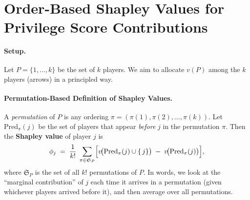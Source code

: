 \documentclass{article}
\begin{document}





\section*{Order-Based Shapley Values for Privilege Score Contributions}

\paragraph{Setup.}
Let $P = \{1,\dots,k\}$ be the set of $k$ players.  
We aim to allocate $v(P)$ among the $k$ players (arrows) in a principled way.

\medskip

\paragraph{Permutation-Based Definition of Shapley Values.}
A \emph{permutation} of $P$ is any ordering $\pi = (\pi(1), \pi(2), \dots, \pi(k))$.  
Let $\mathrm{Pred}_\pi(j)$ be the set of players that appear \emph{before} $j$ in the permutation $\pi$.  
Then the \textbf{Shapley value} of player $j$ is
\[
\phi_j 
\;=\;
\frac{1}{k!}\;
\sum_{\pi \in \mathfrak{S}_P}
\Bigl[v\!\bigl(\mathrm{Pred}_\pi(j) \cup \{\,j\}\bigr)
\;-\;
v\!\bigl(\mathrm{Pred}_\pi(j)\bigr)\Bigr],
\]
where $\mathfrak{S}_P$ is the set of all $k!$ permutations of $P$.  
In words, we look at the “marginal contribution” of $j$ each time it arrives in a permutation (given whichever players arrived before it), and then average over all permutations.
\end{document}
